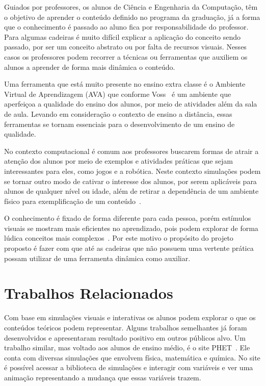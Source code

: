 \documentclass[tcc,capa]{texufpel}
\begin{document}
Guiados por professores, os alunos de Ciência e Engenharia da Computação, têm o objetivo de aprender o conteúdo definido no programa da graduação, já a forma que o conhecimento é passado ao aluno fica por responsabilidade do professor. Para algumas cadeiras é muito difícil explicar a aplicação do conceito sendo passado, por ser um conceito abstrato ou por falta de recursos visuais. Nesses casos os professores podem recorrer a técnicas ou ferramentas que auxiliem os alunos a aprender de forma mais dinâmica o conteúdo.

Uma ferramenta que está muito presente no ensino extra classe é o Ambiente Virtual de Aprendizagem (AVA) que conforme Voss~\cite{Voss_Nunes_Herpich_Medina_2015} é um ambiente que aperfeiçoa a qualidade do ensino dos alunos, por meio de atividades além da sala de aula. Levando em consideração o contexto de ensino a distância, essas ferramentas se tornam essenciais para o desenvolvimento de um ensino de qualidade. 

No contexto computacional é comum aos professores buscarem formas de atrair a atenção dos alunos por meio de exemplos e atividades práticas que sejam interessantes para eles, como jogos e a robótica. Neste contexto simulações podem se tornar outro modo de cativar o interesse dos alunos, por serem aplicáveis para alunos de qualquer nível ou idade, além de retirar a dependência de um ambiente físico para exemplificação de um conteúdo~\cite{kincaid2003simulation}.

O conhecimento é fixado de forma diferente para cada pessoa, porém estímulos visuais se mostram mais eficientes no aprendizado, pois podem explorar de forma lúdica conceitos mais complexos~\cite{klawe1999computer}. Por este motivo o propósito do projeto proposto é fazer com que até as cadeiras que não possuem uma vertente prática possam utilizar de uma ferramenta dinâmica como auxiliar.

\chapter{Trabalhos Relacionados}
\label{cap: trabalhos_relacionados}

Com base em simulações visuais e interativas os alunos podem explorar o que os conteúdos teóricos podem representar. Alguns trabalhos semelhantes já foram desenvolvidos e apresentaram resultado positivo em outros públicos alvo. Um trabalho similar, mas voltado aos alunos de ensino médio, é o site PHET~\cite{phet_2002}. Ele conta com diversas simulações que envolvem física, matemática e química. No site é possível acessar a biblioteca de simulações e interagir com variáveis e ver uma animação representando a mudança que essas variáveis trazem. 
\end{document}
